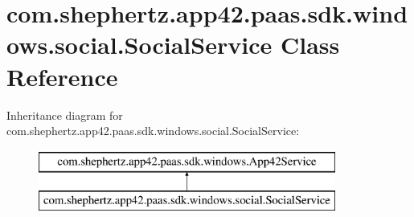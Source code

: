 \hypertarget{classcom_1_1shephertz_1_1app42_1_1paas_1_1sdk_1_1windows_1_1social_1_1_social_service}{\section{com.\+shephertz.\+app42.\+paas.\+sdk.\+windows.\+social.\+Social\+Service Class Reference}
\label{classcom_1_1shephertz_1_1app42_1_1paas_1_1sdk_1_1windows_1_1social_1_1_social_service}
}
Inheritance diagram for com.\+shephertz.\+app42.\+paas.\+sdk.\+windows.\+social.\+Social\+Service\+:\begin{figure}[H]
\begin{center}
\leavevmode
\includegraphics[height=2.000000cm]{classcom_1_1shephertz_1_1app42_1_1paas_1_1sdk_1_1windows_1_1social_1_1_social_service}
\end{center}
\end{figure}
